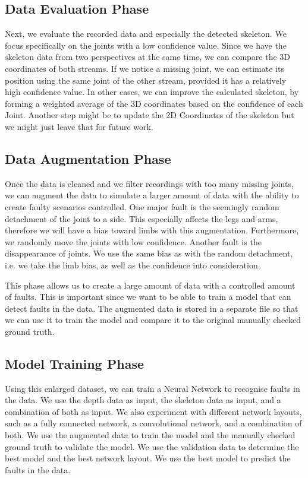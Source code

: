 \subsection{Data Evaluation Phase}

Next, we evaluate the recorded data and especially the detected skeleton. We focus specifically on the joints with a low confidence value. Since we have the skeleton data from two perspectives at the same time, we can compare the 3D coordinates of both streams. If we notice a missing joint, we can estimate its position using the same joint of the other stream, provided it has a relatively high confidence value. In other cases, we can improve the calculated skeleton, by forming a weighted average of the 3D coordinates based on the confidence of each Joint. Another step might be to update the 2D Coordinates of the skeleton but we might just leave that for future work. %

\subsection{Data Augmentation Phase}

Once the data is cleaned and we filter recordings with too many missing joints, we can augment the data to simulate a larger amount of data with the ability to create faulty scenarios controlled. One major fault is the seemingly random detachment of the joint to a side. This especially affects the legs and arms, therefore we will have a bias toward limbs with this augmentation. Furthermore, we randomly move the joints with low confidence. Another fault is the disappearance of joints. We use the same bias as with the random detachment, i.e. we take the limb bias, as well as the confidence into consideration.

This phase allows us to create a large amount of data with a controlled amount of faults. This is important since we want to be able to train a model that can detect faults in the data. The augmented data is stored in a separate file so that we can use it to train the model and compare it to the original manually checked ground truth.

\subsection{Model Training Phase}

Using this enlarged dataset, we can train a Neural Network to recognise faults in the data. We use the depth data as input, the skeleton data as input, and a combination of both as input. We also experiment with different network layouts, such as a fully connected network, a convolutional network, and a combination of both. We use the augmented data to train the model and the manually checked ground truth to validate the model. We use the validation data to determine the best model and the best network layout. We use the best model to predict the faults in the data. 

